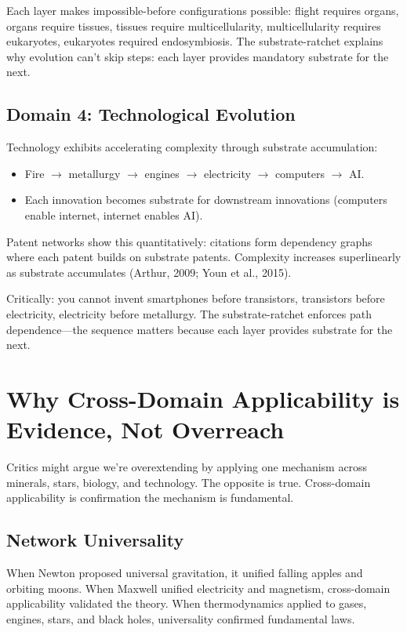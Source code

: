 \documentclass[12pt,a4paper]{article}
\begin{document}
Each layer makes impossible-before configurations possible: flight requires organs, organs require tissues, tissues require multicellularity, multicellularity requires eukaryotes, eukaryotes required endosymbiosis. The substrate-ratchet explains why evolution can't skip steps: each layer provides mandatory substrate for the next.

\subsection{Domain 4: Technological Evolution}

Technology exhibits accelerating complexity through substrate accumulation:

\begin{itemize}
    \item Fire $\rightarrow$ metallurgy $\rightarrow$ engines $\rightarrow$ electricity $\rightarrow$ computers $\rightarrow$ AI.
    \item Each innovation becomes substrate for downstream innovations (computers enable internet, internet enables AI).
\end{itemize}

Patent networks show this quantitatively: citations form dependency graphs where each patent builds on substrate patents. Complexity increases superlinearly as substrate accumulates (Arthur, 2009; Youn et al., 2015).

Critically: you cannot invent smartphones before transistors, transistors before electricity, electricity before metallurgy. The substrate-ratchet enforces path dependence---the sequence matters because each layer provides substrate for the next.

\section{Why Cross-Domain Applicability is Evidence, Not Overreach}

Critics might argue we're overextending by applying one mechanism across minerals, stars, biology, and technology. The opposite is true. Cross-domain applicability is confirmation the mechanism is fundamental.

\subsection{Network Universality}

When Newton proposed universal gravitation, it unified falling apples and orbiting moons. When Maxwell unified electricity and magnetism, cross-domain applicability validated the theory. When thermodynamics applied to gases, engines, stars, and black holes, universality confirmed fundamental laws.
\end{document}
